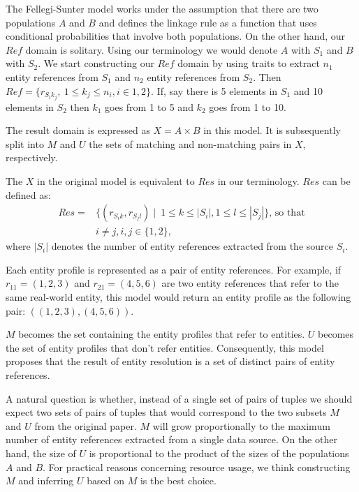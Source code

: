 \documentclass[journal]{IEEEtran}
\begin{document}
    The Fellegi-Sunter model works under the assumption that there are two
    populations $A$ and $B$ and defines the linkage rule as a function that uses
    conditional probabilities that involve both populations.
    On the other hand, our $Ref$ domain is solitary.
    Using our terminology we would denote $A$ with $S_1$ and $B$ with $S_2$.
    We start constructing our $Ref$ domain by using traits to extract $n_1$
    entity references from $S_1$ and $n_2$ entity references from $S_2$.
    Then $Ref = \{r_{{S_i}{k_j}},~1 \leq k_j \leq n_i, i \in {1, 2} \}$.
    If, say there is 5 elements in $S_1$ and 10 elements in $S_2$ then $k_1$ goes
    from 1 to 5 and $k_2$ goes from 1 to 10.

    The result domain is expressed as $X = A \times B$ in this model.
    It is subsequently split into $M$ and $U$ the sets of matching and
    non-matching pairs in $X$, respectively.

    The $X$ in the original model is equivalent to $Res$ in our terminology.
    $Res$ can be defined as:
    \begin{align}
        Res = &\{(r_{{S_i}{k}}, r_{{S_j}{l}})\mid~1 \leq k \leq |S_i|,
        1 \leq l \leq |S_j|\}\textrm{, so that}\nonumber\\
        &i \neq j, i,j \in \{1, 2\}\textrm{,}\nonumber
    \end{align}
    where $|S_i|$ denotes the number of entity references extracted from the
    source $S_i$.

    Each entity profile is represented as a pair of entity references.
    For example, if $r_{11}=(1, 2, 3)$ and $r_{21}=(4, 5, 6)$ are two entity
    references that refer to the same real-world entity, this model would return
    an entity profile as the following pair: $((1, 2, 3), (4, 5, 6))$.

    $M$ becomes the set containing the entity profiles that refer to entities.
    $U$ becomes the set of entity profiles that don't refer entities.
    Consequently, this model proposes that the result of entity resolution is a
    set of distinct pairs of entity references.

    A natural question is whether, instead of a single set of pairs of tuples we
    should expect two sets of pairs of tuples that would correspond to the two
    subsets $M$ and $U$ from the original paper.
    $M$ will grow proportionally to the maximum number of entity references
    extracted from a single data source.
    On the other hand, the size of $U$ is proportional to the product of the
    sizes of the populations $A$ and $B$.
    For practical reasons concerning resource usage, we think constructing $M$
    and inferring $U$ based on $M$ is the best choice.
\end{document}
